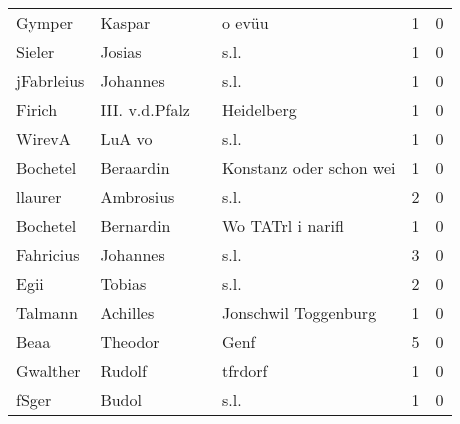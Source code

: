 \begin{center}
\begin{tiny}
\begin{longtabu}{llllrr}
                   Gymper &                             Kaspar &             &                                      o evüu &          1 &         0 \\
                   Sieler &                             Josias &             &                                        s.l. &          1 &         0 \\
               jFabrleius &                           Johannes &             &                                        s.l. &          1 &         0 \\
                   Firich &                     III. v.d.Pfalz &             &                                  Heidelberg &          1 &         0 \\
                   WirevA &                             LuA vo &             &                                        s.l. &          1 &         0 \\
                 Bochetel &                          Beraardin &             &                     Konstanz oder schon wei &          1 &         0 \\
                  llaurer &                          Ambrosius &             &                                        s.l. &          2 &         0 \\
                 Bochetel &                          Bernardin &             &                           Wo TATrl i narifl &          1 &         0 \\
                Fahricius &                           Johannes &             &                                        s.l. &          3 &         0 \\
                     Egii &                             Tobias &             &                                        s.l. &          2 &         0 \\
                  Talmann &                           Achilles &             &                        Jonschwil Toggenburg &          1 &         0 \\
                     Beaa &                            Theodor &             &                                        Genf &          5 &         0 \\
                 Gwalther &                             Rudolf &             &                                     tfrdorf &          1 &         0 \\
                    fSger &                              Budol &             &                                        s.l. &          1 &         0 \\

\end{longtabu}
\end{tiny}
\end{center}
